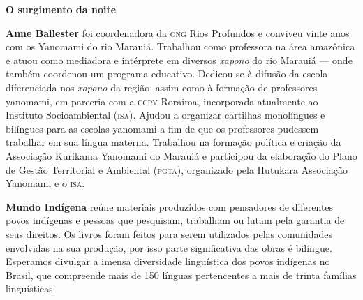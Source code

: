 \textbf{O surgimento da noite} 

\textbf{Anne Ballester} foi coordenadora da \textsc{ong} Rios Profundos e conviveu vinte anos com os Yanomami do rio Marauiá. Trabalhou como professora na área amazônica e atuou como mediadora e intérprete em diversos \textit{xapono} do rio Marauiá --- onde também coordenou um programa educativo. Dedicou-se à difusão da escola diferenciada nos \textit{xapono} da região, assim como à formação de professores yanomami, em parceria com a \textsc{ccpy} Roraima, incorporada atualmente ao Instituto Socioambiental (\textsc{isa}). Ajudou a organizar cartilhas monolíngues e bilíngues para as escolas yanomami a fim de que os professores pudessem trabalhar em sua língua materna. Trabalhou na formação política e criação da Associação Kurikama Yanomami do Marauiá e participou da elaboração do Plano de Gestão Territorial e Ambiental (\textsc{pgta}), organizado pela Hutukara Associação Yanomami e o \textsc{isa}.

\textbf{Mundo Indígena} reúne materiais produzidos com pensadores de diferentes povos indígenas e pessoas que pesquisam, trabalham ou lutam pela garantia de seus direitos. Os livros foram feitos para serem utilizados pelas comunidades envolvidas na sua produção, por isso parte significativa das obras é bilíngue. Esperamos divulgar a imensa diversidade linguística dos povos indígenas no Brasil, que compreende mais de 150 línguas pertencentes a mais de trinta famílias linguísticas.



